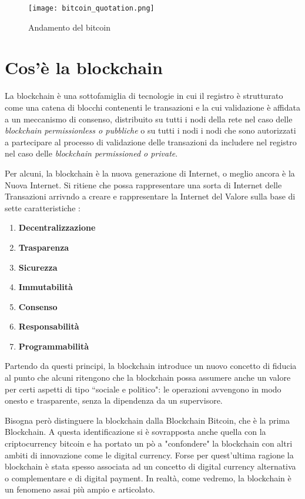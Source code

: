 \begin{figure}[htbp]
  \centering
  \texttt{[image: bitcoin\_quotation.png]}
  \caption{Andamento del bitcoin}
  \label{fig:bitcoin_quotation}
\end{figure}

\section{Cos'è la blockchain}
La blockchain è una sottofamiglia di tecnologie in cui il registro è strutturato come una catena di blocchi contenenti le transazioni e la cui validazione è affidata a un meccanismo di consenso, distribuito su tutti i nodi della rete nel caso delle \textit{blockchain permissionless o pubbliche} o su tutti i nodi i nodi che sono autorizzati a partecipare al processo di validazione delle transazioni da includere nel registro nel caso delle \textit{blockchain permissioned o private}.

Per alcuni, la blockchain è la nuova generazione di Internet, o meglio ancora è la Nuova Internet. Si ritiene che possa rappresentare una sorta di Internet delle Transazioni arrivndo a creare e rappresentare la Internet del Valore sulla base di sette caratteristiche \cite{bellini_2021}:

\begin{enumerate}
  \item \textbf{Decentralizzazione}
  \item \textbf{Trasparenza}
  \item \textbf{Sicurezza}
  \item \textbf{Immutabilità}
  \item \textbf{Consenso}
  \item \textbf{Responsabilità}
  \item \textbf{Programmabilità}
\end{enumerate}

Partendo da questi principi, la blockchain introduce un nuovo concetto di fiducia al punto che alcuni ritengono che la blockchain possa assumere anche un valore per certi aspetti di tipo “sociale e politico": le operazioni avvengono in modo onesto e trasparente, senza la dipendenza da un supervisore.

Bisogna però distinguere la blockchain dalla Blockchain Bitcoin, che è la prima Blockchain. A questa identificazione si è sovrapposta anche quella con la criptocurrency bitcoin e ha portato un pò a "confondere" la blockchain con altri ambiti di innovazione come le digital currency. Forse per quest'ultima ragione la blockchain è stata spesso associata ad un concetto di digital currency alternativa o complementare e di digital payment. In realtà, come vedremo, la blockchain è un fenomeno assai più ampio e articolato.

